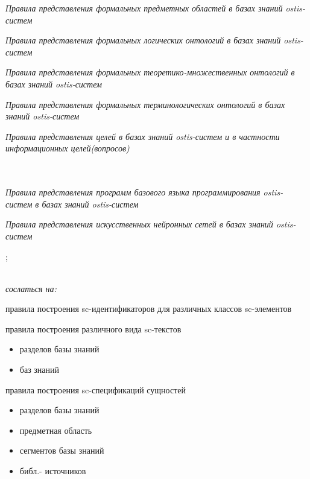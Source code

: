 \begin{SCn}
{{\begin{scnitemize}
			\item\textit{Правила представления формальных предметных областей в базах знаний ostis-систем}
			\item\textit{Правила представления формальных логических онтологий в базах знаний ostis-систем}
			\item\textit{Правила представления формальных теоретико-множественных онтологий в базах знаний ostis-систем}
			\item\textit{Правила представления формальных терминологических онтологий в базах знаний ostis-систем}
			\item\textit{Правила представления целей в базах знаний ostis-систем и в частности информационных целей(вопросов)}\\
				\\
				\\
			\item\textit{Правила представления программ базового языка программирования ostis-систем в базах знаний ostis-систем}
			\item\textit{Правила представления искусственных нейронных сетей в базах знаний \textit{ostis-систем}}
		\end{scnitemize}};
	}
\\
\textit{сослаться на:}
\begin{scnitemize}
	\item правила построения sc-идентификаторов для различных классов sc-элементов
	\item правила построения различного вида sc-текстов
	\begin{itemize}
		\item разделов базы знаний
		\item баз знаний	
	\end{itemize}	
\end{scnitemize}
\begin{scnitemize}
	\item правила построения sc-спецификаций сущностей
	\begin{itemize}
		\item разделов базы знаний
		\item предметная область
		\item сегментов базы знаний
		\item библ.- источников	

\end{itemize}
\end{scnitemize}
\end{SCn}
